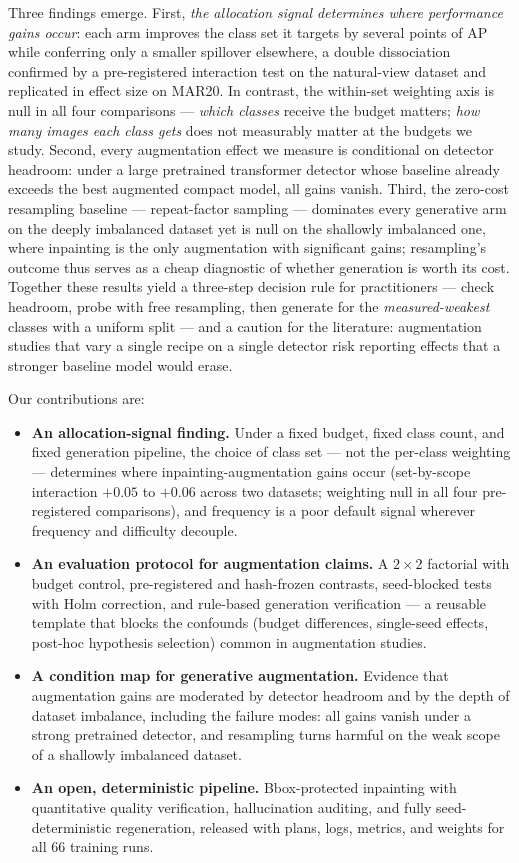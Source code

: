 \documentclass[preprint,12pt,authoryear]{elsarticle}
\begin{document}
Three findings emerge. First, \emph{the allocation signal determines
where performance gains occur}: each arm improves the class set it
targets by several points of AP while conferring only a smaller
spillover elsewhere, a double dissociation confirmed by a pre-registered
interaction test on the natural-view dataset and replicated in effect
size on MAR20. In contrast, the within-set weighting axis is null in all
four comparisons --- \emph{which classes} receive the budget matters;
\emph{how many images each class gets} does not measurably matter at the
budgets we study. Second, every augmentation effect we measure is
conditional on detector headroom: under a large pretrained transformer
detector whose baseline already exceeds the best augmented compact
model, all gains vanish. Third, the zero-cost resampling baseline ---
repeat-factor sampling --- dominates every generative arm on the deeply
imbalanced dataset yet is null on the shallowly imbalanced one, where
inpainting is the only augmentation with significant gains; resampling's
outcome thus serves as a cheap diagnostic of whether generation is worth
its cost. Together these results yield a three-step decision rule for
practitioners --- check headroom, probe with free resampling, then
generate for the \emph{measured-weakest} classes with a uniform split
--- and a caution for the literature: augmentation studies that vary a
single recipe on a single detector risk reporting effects that a
stronger baseline model would erase.

Our contributions are:
\begin{itemize}
\item \textbf{An allocation-signal finding.} Under a fixed budget, fixed
  class count, and fixed generation pipeline, the choice of class set
  --- not the per-class weighting --- determines where
  inpainting-augmentation gains occur (set-by-scope interaction $+0.05$
  to $+0.06$ across two datasets; weighting null in all four
  pre-registered comparisons), and frequency is a poor default signal
  wherever frequency and difficulty decouple.
\item \textbf{An evaluation protocol for augmentation claims.} A
  $2\times2$ factorial with budget control, pre-registered and
  hash-frozen contrasts, seed-blocked tests with Holm correction, and
  rule-based generation verification --- a reusable template that blocks
  the confounds (budget differences, single-seed effects, post-hoc
  hypothesis selection) common in augmentation studies.
\item \textbf{A condition map for generative augmentation.} Evidence
  that augmentation gains are moderated by detector headroom and by the
  depth of dataset imbalance, including the failure modes: all gains
  vanish under a strong pretrained detector, and resampling turns
  harmful on the weak scope of a shallowly imbalanced dataset.
\item \textbf{An open, deterministic pipeline.} Bbox-protected
  inpainting with quantitative quality verification, hallucination
  auditing, and fully seed-deterministic regeneration, released with
  plans, logs, metrics, and weights for all 66 training runs.
\end{itemize}
\end{document}
